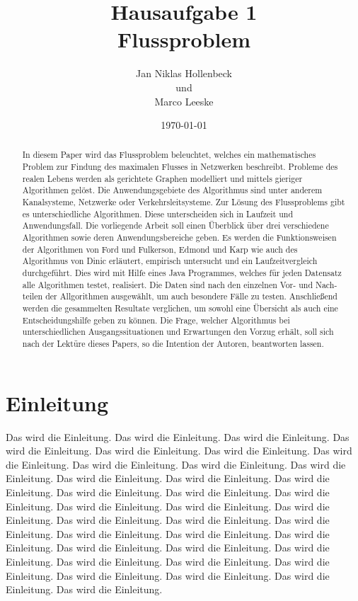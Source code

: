 \documentclass[11pt]{article}
\title{Hausaufgabe 1 \\ Flussproblem}
\author{Jan Niklas Hollenbeck \\ und \\ Marco Leeske}
\date{\today}
\begin{document}
\maketitle

\newpage

\begin{abstract}

In diesem Paper wird das Flussproblem beleuchtet, welches ein mathematisches Problem zur Findung des maximalen Flusses in Netzwerken beschreibt.
 Probleme des realen Lebens werden als gerichtete Graphen modelliert und mittels gieriger Algorithmen gelöst.
 Die Anwendungsgebiete des Algorithmus sind unter anderem Kanalsysteme, Netzwerke oder Verkehrsleitsysteme.
 Zur Lösung des Flussproblems gibt es unterschiedliche Algorithmen. Diese unterscheiden sich in Laufzeit und Anwendungsfall.
 Die vorliegende Arbeit soll einen Überblick über drei verschiedene Algorithmen sowie deren  Anwendungsbereiche geben.
 Es werden die Funktionsweisen der Algorithmen von Ford und Fulkerson, Edmond und Karp wie auch des Algorithmus von Dinic erläutert, empirisch untersucht und ein Laufzeitvergleich durchgeführt.
 Dies wird mit Hilfe eines Java Programmes, welches für jeden Datensatz alle Algorithmen testet, realisiert.
 Die Daten sind nach den einzelnen Vor- und Nach-teilen der Allgorithmen ausgewählt, um auch besondere  Fälle zu testen.
 Anschließend werden die gesammelten Resultate verglichen, um sowohl eine Übersicht als auch eine Entscheidungshilfe geben zu können.
 Die Frage, welcher Algorithmus bei unterschiedlichen Ausgangssituationen und Erwartungen den Vorzug erhält, soll sich nach der Lektüre dieses Papers, so die Intention der Autoren, beantworten lassen. 

\end{abstract}


\section{Einleitung}
\label{Einleitung}

Das wird die Einleitung. Das wird die Einleitung. Das wird die Einleitung. Das wird die Einleitung. Das wird die Einleitung. Das wird die Einleitung. Das wird die Einleitung. Das wird die Einleitung. Das wird die Einleitung. Das wird die Einleitung. Das wird die Einleitung. Das wird die Einleitung. Das wird die Einleitung. Das wird die Einleitung. Das wird die Einleitung. Das wird die Einleitung. Das wird die Einleitung. Das wird die Einleitung. Das wird die Einleitung. Das wird die Einleitung. Das wird die Einleitung. Das wird die Einleitung. Das wird die Einleitung. Das wird die Einleitung. Das wird die Einleitung. Das wird die Einleitung. Das wird die Einleitung. Das wird die Einleitung. Das wird die Einleitung. Das wird die Einleitung. Das wird die Einleitung. Das wird die Einleitung. Das wird die Einleitung. Das wird die Einleitung. Das wird die Einleitung. 
\end{document}
